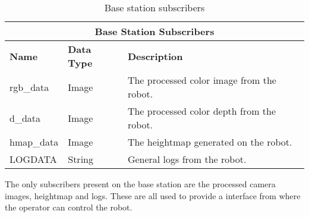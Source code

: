         \begin{table}[h]
            \centering
            \begin{tabularx}{\textwidth}{| l | l | X |}
                \hline
                \multicolumn{3}{|c|}{\textbf{Base Station Subscribers}} \\ \hline
                \textbf{Name} & \textbf{Data Type} & \textbf{Description} \\ \hline
                rgb\_data & Image & The processed color image from the robot. \\ \hline
                d\_data & Image & The processed color depth from the robot. \\ \hline
                hmap\_data & Image & The heightmap generated on the robot. \\ \hline
                LOGDATA & String & General logs from the robot. \\ \hline
            \end{tabularx}
            \caption{Base station subscribers}
            \label{tab:base_subs}
        \end{table}
        
        \noindent
        The only subscribers present on the base station are the processed camera images, heightmap and logs. These are all used to provide a interface from where
        the operator can control the robot.

